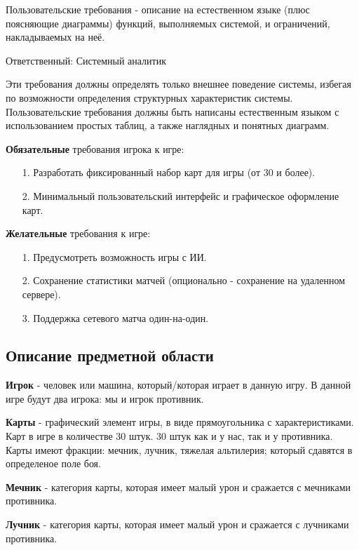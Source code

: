 \documentclass[12pt, a4paper, simple]{eskdtext}
\begin{document}
    Пользовательские требования - описание на естественном языке (плюс поясняющие диаграммы) функций, выполняемых системой, и ограничений, накладываемых на неё.

    Ответственный: Системный аналитик

    Эти требования должны определять только внешнее поведение системы, избегая по возможности определения структурных характеристик системы.
    Пользовательские требования должны быть написаны естественным языком с использованием простых таблиц, а также наглядных и понятных диаграмм.

    \textbf{Обязательные} требования игрока к игре:

    \begin{enumerate}
        \item [1.] Разработать фиксированный набор карт для игры (от 30 и более).
        \item [2.] Минимальный пользовательский интерфейс и графическое оформление карт.
    \end{enumerate}

    \textbf{Желательные} требования к игре:

    \begin{enumerate}
        \item [1.] Предусмотреть возможность игры с ИИ.
        \item [2.] Сохранение статистики матчей (опционально - сохранение на удаленном сервере).
        \item [3.] Поддержка сетевого матча один-на-один.
    \end{enumerate}

    \newpage
    \subsection{Описание предметной области}

    \textbf{Игрок} - человек или машина, который/которая играет в данную игру.
    В данной игре будут два игрока: мы и игрок противник.

    \textbf{Карты} - графический элемент игры, в виде прямоугольника с характеристиками.
    Карт в игре в количестве 30 штук. 30 штук как и у нас, так и у противника.
    Карты имеют фракции: мечник, лучник, тяжелая альтилерия; который сдавятся в определеное поле боя.
    
    \textbf{Мечник} - категория карты, которая имеет малый урон и сражается с мечниками противника.

    \textbf{Лучник} - категория карты, которая имеет малый урон и сражается с лучниками противника.
\end{document}
